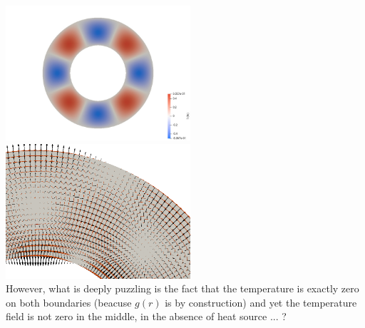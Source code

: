 \includegraphics[height=5cm]{images/benchmark_annulus_conv/T}
\includegraphics[height=5cm]{images/benchmark_annulus_conv/arrows}\\

However, what is deeply puzzling is the fact that the temperature is exactly zero on both 
boundaries (beacuse $g(r)$ is by construction) 
and yet the temperature field is not zero in the middle, in the absence of heat source ... ?













